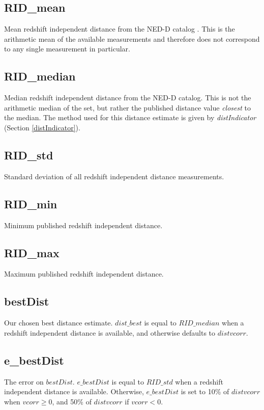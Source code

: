 \documentclass[iop]{emulateapj-rtx4}
\begin{document}
\subsection{RID\_mean}
Mean redshift independent distance from the NED-D catalog \citep{tully2009}. This is the arithmetic mean of the available measurements and therefore does not correspond to any single measurement in particular.

\subsection{RID\_median}
Median redshift independent distance from the NED-D catalog. This is not the arithmetic median of the set, but rather the published distance value \emph{closest} to the median. The method used for this distance estimate is given by \emph{distIndicator} (Section \ref{distIndicator}).

\subsection{RID\_std}
Standard deviation of all redshift independent distance measurements.

\subsection{RID\_min}
Minimum published redshift independent distance.

\subsection{RID\_max}
Maximum published redshift independent distance.

\subsection{bestDist}
Our chosen best distance estimate. $dist\_best$ is equal to $RID\_median$ when a redshift independent distance is available, and otherwise defaults to $distvcorr$.

\subsection{e\_bestDist}
The error on $bestDist$. $e\_bestDist$ is equal to $RID\_std$ when a redshift independent distance is available. Otherwise, $e\_bestDist$ is set to 10\% of $distvcorr$ when $vcorr \geq 0$, and 50\% of $distvcorr$ if $vcorr < 0$.
\end{document}
